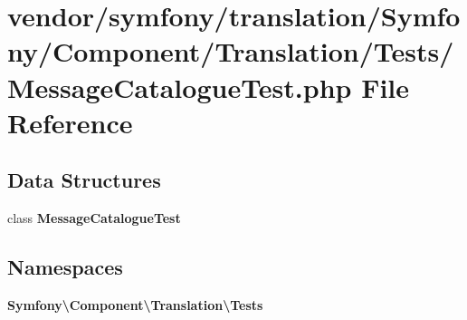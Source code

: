 \section{vendor/symfony/translation/\+Symfony/\+Component/\+Translation/\+Tests/\+Message\+Catalogue\+Test.php File Reference}
\label{_message_catalogue_test_8php}
\subsection*{Data Structures}
\begin{DoxyCompactItemize}
\item 
class {\bf Message\+Catalogue\+Test}
\end{DoxyCompactItemize}
\subsection*{Namespaces}
\begin{DoxyCompactItemize}
\item 
 {\bf Symfony\textbackslash{}\+Component\textbackslash{}\+Translation\textbackslash{}\+Tests}
\end{DoxyCompactItemize}
